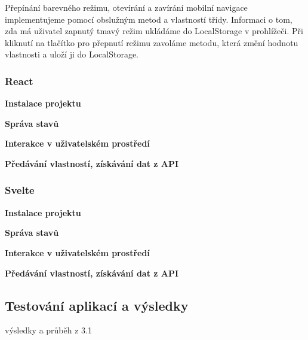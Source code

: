 Přepínání barevného režimu, otevírání a zavírání mobilní navigace implementujeme pomocí obslužným metod a vlastností třídy. 
Informaci o tom, zda má uživatel zapnutý tmavý režim ukládáme do LocalStorage v prohlížeči. 
Při kliknutí na tlačítko pro přepnutí režimu zavoláme metodu, která změní hodnotu vlastnosti a uloží ji do LocalStorage.

\subsubsection{React}

\begin{flushleft}
  \textbf{Instalace projektu}
\end{flushleft}

\begin{flushleft}
  \textbf{Správa stavů}
\end{flushleft}

\begin{flushleft}
  \textbf{Interakce v uživatelském prostředí}
\end{flushleft}

\begin{flushleft}
  \textbf{Předávání vlastností, získávání dat z API}
\end{flushleft}


\subsubsection{Svelte}

\begin{flushleft}
  \textbf{Instalace projektu}
\end{flushleft}

\begin{flushleft}
  \textbf{Správa stavů}
\end{flushleft}

\begin{flushleft}
  \textbf{Interakce v uživatelském prostředí}
\end{flushleft}

\begin{flushleft}
  \textbf{Předávání vlastností, získávání dat z API}
\end{flushleft}


\subsection{Testování aplikací a výsledky}

\begin{citemize}
	\item výsledky a průběh z 3.1
\end{citemize}

